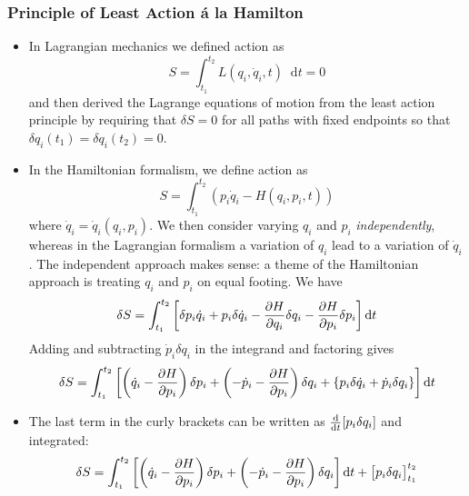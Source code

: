\documentclass[11pt, a4paper]{article}
\newcommand{\diff}{\mathop{}\!\mathrm{d}} %
\begin{document}
\subsubsection{Principle of Least Action \'{a} la Hamilton}
\begin{itemize}
	\item In Lagrangian mechanics we defined action as 
	\begin{equation*}
		S = \int_{t_{1}}^{t_{2}} L(q_{i}, \dot{q}_{i}, t) \diff t = 0
	\end{equation*}
	and then derived the Lagrange equations of motion from the least action principle by requiring that $ \delta S = 0 $ for all paths with fixed endpoints so that $ \delta q_{i}(t_{1}) = \delta q_{i}(t_{2}) = 0 $.
	
	\item In the Hamiltonian formalism, we define action as
	\begin{equation*}
		S = \int_{t_{1}}^{t_{2}}(p_{i}\dot{q}_{i} - H(q_{i}, p_{i}, t))
	\end{equation*}
	where $ \dot{q}_{i} = \dot{q}_{i}(q_{i}, p_{i}) $.	We then consider varying $ q_{i} $ and $ p_{i} $ \textit{independently}, whereas in the Lagrangian formalism a variation of $ q_{i} $ lead to a variation of $ \dot{q}_{i} $. The independent approach makes sense: a theme of the Hamiltonian approach is treating $ q_{i} $ and $ p_{i} $ on equal footing. We have
	\begin{equation*}
		\delta S = \int_{t_{1}}^{t_{2}} \left[\delta p_{i} \dot{q}_{i} + p_{i} \delta \dot{q}_{i} - \pdv{H}{q_{i}}\delta q_{i} - \pdv{H}{p_{i}}\delta p_{i}\right] \diff t
	\end{equation*}
	Adding and subtracting $ \dot{p}_{i}\delta q_{i} $ in the integrand and factoring gives
	\begin{equation*}
			\delta S = \int_{t_{1}}^{t_{2}} \left[\left(\dot{q}_{i} - \pdv{H}{p_{i}}\right)\delta p_{i} + \left(-\dot{p}_{i} - \pdv{H}{p_{i}}\right)\delta q_{i} +  \{ p_{i}\delta \dot{q}_{i} + \dot{p}_{i} \delta q_{i}  \} \right] \diff t
	\end{equation*}
	
	\item The last term in the curly brackets can be written as $ \dv{}{t}[p_{i}\delta q_{i}] $ and integrated:
	\begin{equation*}
		\delta S = \int_{t_{1}}^{t_{2}} \left[\left(\dot{q}_{i} - \pdv{H}{p_{i}}\right)\delta p_{i} + \left(-\dot{p}_{i} - \pdv{H}{p_{i}}\right)\delta q_{i} \right] \diff t + \big[p_{i}\delta q_{i} \big]_{t_{1}}^{t_{2}}
	\end{equation*}
	

\end{itemize}
\end{document}
